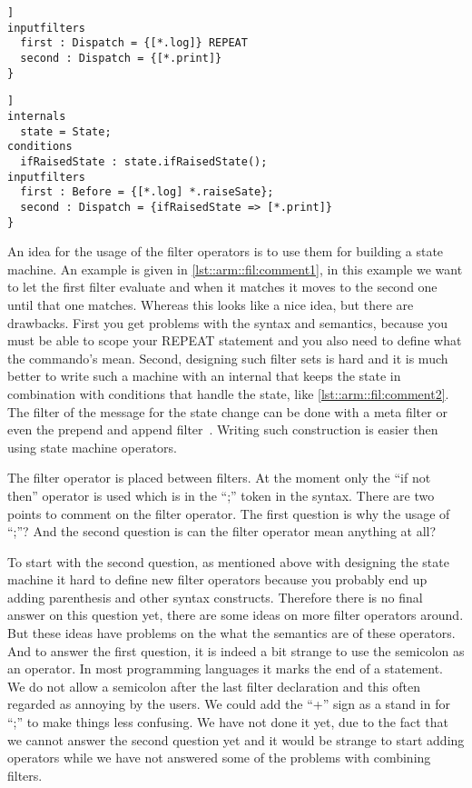 \begin{lstlisting}[caption = {Idea for a filter state machine}, label=lst::arm::fil:comment1,style = listing, language = ComposeStar,float=[tpb]]
inputfilters
  first : Dispatch = {[*.log]} REPEAT
  second : Dispatch = {[*.print]}
}
\end{lstlisting}
\begin{lstlisting}[caption = {State machine with filter operators}, label=lst::arm::fil:comment2,style = listing, language = ComposeStar,float=[tpb]]
internals
  state = State;
conditions
  ifRaisedState : state.ifRaisedState();
inputfilters
  first : Before = {[*.log] *.raiseSate};
  second : Dispatch = {ifRaisedState => [*.print]}
}
\end{lstlisting}
An idea for the usage of the filter operators is to use them for building a state machine. An example is given in
\autoref{lst::arm::fil:comment1}, in this example we want to let the first filter evaluate and when it matches it moves to the second one until that one matches.
Whereas this looks like a nice idea, but there are drawbacks. First you get
problems with the
syntax and semantics, because you must be able to scope your REPEAT statement and you also need to define
what the commando's mean. Second, designing such filter sets is hard and it is much better to write
such a machine with an internal that keeps the state in combination with conditions that handle the state, like \autoref{lst::arm::fil:comment2}.
The filter of the message for the state change can be done with a meta filter or even the prepend and append filter~\cite{Minnen2006}. Writing such construction is easier then using state machine operators.

The filter operator is placed between filters. At the moment only the ``if not then'' operator is used which is in the ``;'' token in the syntax. There are two points to comment on the filter
operator. The first question is why the usage of ``;''? And the second question is can the filter operator mean anything at all?

To start with the second question, as mentioned above with designing the state machine it hard to define new filter operators because you probably end up adding parenthesis and other syntax constructs. Therefore there is no final answer on this question yet, there are some ideas on more filter operators around. But these ideas have problems on the what the semantics are of these operators.
And to answer the first question, it is indeed a bit strange to use the semicolon as an operator. In most programming languages it marks the end of a statement. We do not allow
a semicolon after the last filter declaration and this often regarded as annoying by the users. We could add the ``+'' sign as a stand in for ``;'' to make things less confusing. We have not done it yet, due to the fact that we cannot answer the second question yet and it would
be strange to start adding operators while we have not answered some of the problems with combining filters.
